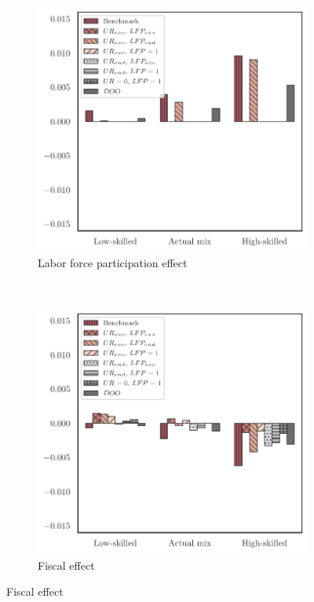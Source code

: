\documentclass[a4paper,12pt]{article}
\begin{document}
\begin{landscape}
\begin{center}
\begin{figure}[htb!]
\begin{subfigure}{.3\linewidth}
\end{subfigure}
\hfill
\begin{subfigure}{.3\linewidth}
  \centering
  \caption{Labor force participation effect} \label{fig:decomp_mean_lnINC}
  \includegraphics[width=\linewidth]{graphs/qlnINC.pdf}
\end{subfigure}
\\[0.5cm]
\begin{subfigure}{.3\linewidth}
  \centering
  \caption{Fiscal effect} \label{fig:decomp_mean_tauINC}
  \includegraphics[width=\linewidth]{graphs/qTauINC.pdf}

\end{subfigure}
\end{figure}
\end{center}
\end{landscape}
\end{document}
